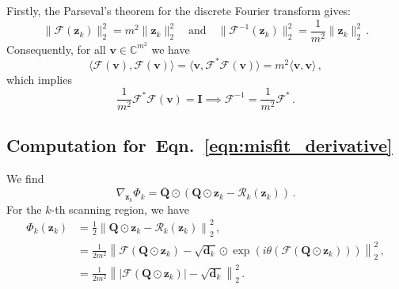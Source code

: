 \documentclass{article}
\numberwithin{equation}{section}
\begin{document}
Firstly, the Parseval's theorem for the discrete Fourier transform gives:
\begin{equation*}
\|\mathcal{F}(\bm{z}_k)\|_2^2=m^2\|\bm{z}_k\|_2^2\quad\text{and}\quad\|\mathcal{F}^{-1}(\bm{z}_k)\|_2^2=\frac{1}{m^2}\|\bm{z}_k\|_2^2\,.
\end{equation*}
Consequently, for all $\bm{v}\in\mathbb{C}^{m^2}$ we have
\begin{equation*}
\langle\mathcal{F}(\bm{v}),\mathcal{F}(\bm{v})\rangle = \langle \bm{v},\mathcal{F}^\ast\mathcal{F}(\bm{v})\rangle = m^2\langle \bm{v},\bm{v}\rangle\,,
\end{equation*}
which implies 
\begin{equation*}
    \frac{1}{m^2}\mathcal{F}^\ast\mathcal{F}(\bm{v}) = \bm{I} \implies \mathcal{F}^{-1} = \frac{1}{m^2}\mathcal{F}^\ast\,.
\end{equation*}

\subsection[Computation for the Misfit Derivative]{Computation for~Eqn.~\ref{eqn:misfit_derivative}}\label{app:computation_misfit_derivative}
We find
\begin{equation*}
\nabla_{\bm{z}_k} \Phi_k = \overline{\bm{Q}}\odot(\bm{Q}\odot\bm{z}_k - \mathcal{R}_k(\bm{z}_k))\,.
\end{equation*}
For the $k$-th scanning region, we have
\begin{equation*}
    \begin{aligned}
        \Phi_k(\bm{z}_k) &= \frac{1}{2} \left\|\bm{Q}\odot \bm{z}_k - \mathcal{R}_k(\bm{z}_k) \right\|_2^2\,,\\
        &= \frac{1}{2m^2} \left\| \mathcal{F}(\bm{Q}\odot\bm{z}_k)  -\sqrt{\bm{d}_k}\odot\exp\left(i \theta(\mathcal{F}(\bm{Q}\odot \bm{z}_k))\right)\right\|_2^2\,,\\
        &= \frac{1}{2m^2} \left\||\mathcal{F}(\bm{Q}\odot\bm{z}_k)| -  \sqrt{\bm{d}_k}\right\|_2^2\,.
    \end{aligned}
\end{equation*}
\end{document}
